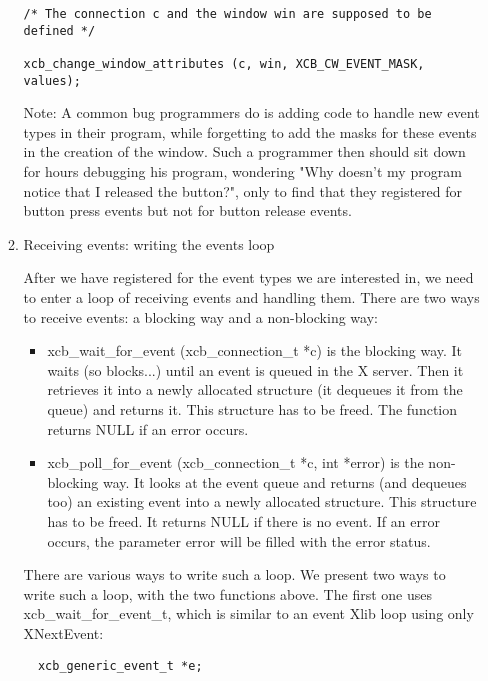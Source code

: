 \documentclass[12pt,oneside,titlepage]{book}
\providecommand{\tightlist}{%
  \setlength{\itemsep}{0pt}\setlength{\parskip}{0pt}}
\begin{document}
\begin{enumerate}
\begin{enumerate}
\begin{verbatim}
/* The connection c and the window win are supposed to be defined */

xcb_change_window_attributes (c, win, XCB_CW_EVENT_MASK, values);
\end{verbatim}

    Note: A common bug programmers do is adding code to handle new event
    types in their program, while forgetting to add the masks for these
    events in the creation of the window. Such a programmer then should
    sit down for hours debugging his program, wondering "Why doesn't my
    program notice that I released the button?", only to find that they
    registered for button press events but not for button release
    events.
  \item
    \protect\hypertarget{loop}{}{Receiving events: writing the events
    loop}

    After we have registered for the event types we are interested in,
    we need to enter a loop of receiving events and handling them. There
    are two ways to receive events: a blocking way and a non-blocking
    way:

    \begin{itemize}
    \tightlist
    \item
      {xcb\_wait\_for\_event (xcb\_connection\_t *c)} is the blocking
      way. It waits (so blocks...) until an event is queued in the X
      server. Then it retrieves it into a newly allocated structure (it
      dequeues it from the queue) and returns it. This structure has to
      be freed. The function returns {NULL} if an error occurs.\\
    \item
      {xcb\_poll\_for\_event (xcb\_connection\_t *c, int *error)} is the
      non-blocking way. It looks at the event queue and returns (and
      dequeues too) an existing event into a newly allocated structure.
      This structure has to be freed. It returns {NULL} if there is no
      event. If an error occurs, the parameter {error} will be filled
      with the error status.
    \end{itemize}

    There are various ways to write such a loop. We present two ways to
    write such a loop, with the two functions above. The first one uses
    {xcb\_wait\_for\_event\_t}, which is similar to an event Xlib loop
    using only {XNextEvent}:

\begin{verbatim}
  xcb_generic_event_t *e;


\end{verbatim}
\end{enumerate}
\end{enumerate}
\end{document}
